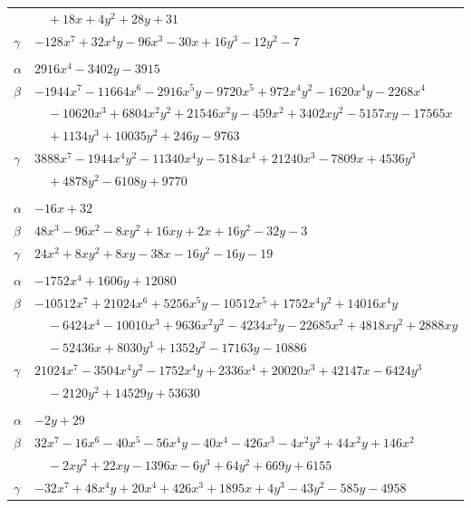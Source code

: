 \documentclass[11pt]{article}
\begin{document}
\begin{longtable}{@{}ll@{}}
 & $\quad +18x+4y^{2}+28y+31$\\
$\gamma$ & $-128x^{7}+32x^{4}y-96x^{3}-30x+16y^{3}-12y^{2}-7$\\
\addlinespace[3pt]
\multicolumn{2}{@{}l}{$\{i,j\}=\{29,50\}$, $k_{ij}=5^{6}$}\\
$\alpha$ & $2916x^{4}-3402y-3915$\\
$\beta$ & $-1944x^{7}-11664x^{6}-2916x^{5}y-9720x^{5}+972x^{4}y^{2}-1620x^{4}y-2268x^{4}$\\
 & $\quad -10620x^{3}+6804x^{2}y^{2}+21546x^{2}y-459x^{2}+3402xy^{2}-5157xy-17565x$\\
 & $\quad +1134y^{3}+10035y^{2}+246y-9763$\\
$\gamma$ & $3888x^{7}-1944x^{4}y^{2}-11340x^{4}y-5184x^{4}+21240x^{3}-7809x+4536y^{3}$\\
 & $\quad +4878y^{2}-6108y+9770$\\
\addlinespace[3pt]
\multicolumn{2}{@{}l}{$\{i,j\}=\{29,55\}$, $k_{ij}=13$}\\
$\alpha$ & $-16x+32$\\
$\beta$ & $48x^{3}-96x^{2}-8xy^{2}+16xy+2x+16y^{2}-32y-3$\\
$\gamma$ & $24x^{2}+8xy^{2}+8xy-38x-16y^{2}-16y-19$\\
\addlinespace[3pt]
\multicolumn{2}{@{}l}{$\{i,j\}=\{29,65\}$, $k_{ij}=2^{2}\cdot 3^{3}\cdot 5\cdot 13\cdot 17$}\\
$\alpha$ & $-1752x^{4}+1606y+12080$\\
$\beta$ & $-10512x^{7}+21024x^{6}+5256x^{5}y-10512x^{5}+1752x^{4}y^{2}+14016x^{4}y$\\
 & $\quad -6424x^{4}-10010x^{3}+9636x^{2}y^{2}-4234x^{2}y-22685x^{2}+4818xy^{2}+2888xy$\\
 & $\quad -52436x+8030y^{3}+1352y^{2}-17163y-10886$\\
$\gamma$ & $21024x^{7}-3504x^{4}y^{2}-1752x^{4}y+2336x^{4}+20020x^{3}+42147x-6424y^{3}$\\
 & $\quad -2120y^{2}+14529y+53630$\\
\addlinespace[3pt]
\multicolumn{2}{@{}l}{$\{i,j\}=\{29,78\}$, $k_{ij}=3^{2}\cdot 5\cdot 13\cdot 17$}\\
$\alpha$ & $-2y+29$\\
$\beta$ & $32x^{7}-16x^{6}-40x^{5}-56x^{4}y-40x^{4}-426x^{3}-4x^{2}y^{2}+44x^{2}y+146x^{2}$\\
 & $\quad -2xy^{2}+22xy-1396x-6y^{3}+64y^{2}+669y+6155$\\
$\gamma$ & $-32x^{7}+48x^{4}y+20x^{4}+426x^{3}+1895x+4y^{3}-43y^{2}-585y-4958$\\

\end{longtable}
\end{document}
